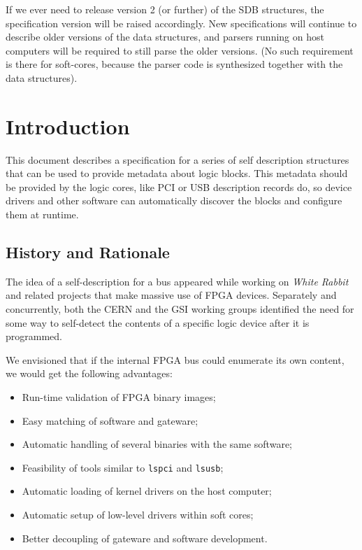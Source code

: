 \documentclass[a4paper, 12pt]{article}
\begin{document}
If we ever need to release version 2 (or further) of the SDB
structures, the specification version will be raised accordingly. New
specifications will continue to describe older versions of the data
structures, and parsers running on host computers will be required to
still parse the older versions.  (No such requirement is there for
soft-cores, because the parser code is synthesized together with the data
structures).

\section{Introduction}

This document describes a specification for a series of self description
structures that can be used to provide metadata about logic blocks. This metadata
should be provided by the logic cores, like PCI or USB description records do,
so device drivers and other software can automatically discover the blocks and
configure them at runtime.

\subsection{History and Rationale}

The idea of a self-description for a  bus appeared while working on
\textit{White Rabbit} and related projects that make massive use of
FPGA devices. Separately and concurrently, both the CERN and the GSI
working groups identified the need for some way to self-detect the
contents of a specific logic device after it is programmed.

We envisioned that if the internal FPGA bus could enumerate its own
content, we would get the following advantages:

\begin{itemize}
\item Run-time validation of FPGA binary images;
\item Easy matching of software and gateware;
\item Automatic handling of several binaries with the same software;
\item Feasibility of tools similar to \texttt{lspci} and \texttt{lsusb};
\item Automatic loading of kernel drivers on the host computer;
\item Automatic setup of low-level drivers within soft cores;
\item Better decoupling of gateware and software development.
\end{itemize}
\end{document}

